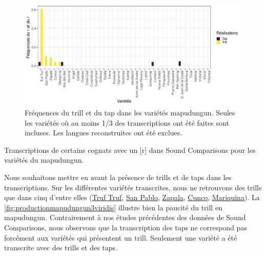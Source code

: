 \begin{figure}
	\centering
	\includegraphics[width=1\linewidth]{substance/images/freq_trill_mapudungun2}
	\caption[Fréquences du trill et du tap dans les variétés mapudungun]{Fréquences du trill et du tap dans les variétés mapudungun. Seules les variétés où au moins 1/3 des transcriptions ont été faites sont incluses. Les langues reconstruites ont été exclues.}
	\label{fig:freqtrillmapudungun}
\end{figure}


\begin{table}
	\centering
	\caption[Transcriptions de certains cognats avec un \textrm{[r]} dans Sound Comparisons pour les variétés du mapudungun]{Transcriptions de certains cognats avec un [r] dans Sound Comparisons pour les variétés du mapudungun.}
	\label{tab:productiontrill_mapudungun}
\end{table}

Nous souhaitons mettre en avant la présence de trills et de taps dans les transcriptions. Sur les différentes variétés transcrites, nous ne retrouvons des trills que dans cinq d'entre elles (\href{https://soundcomparisons.com/#/en/Mapudungun/language/Mpg_Chl_Rgn9_TrufTruf_Danquilco}{Truf Truf}, \href{https://soundcomparisons.com/#/en/Mapudungun/language/Mpg_Chl_Rgn10_SanPablo_Quilacahuin}{San Pablo}, \href{https://soundcomparisons.com/#/en/Mapudungun/language/Mpg_Arg_Nqn_Zapala_RamonCastro}{Zapala}, \href{https://soundcomparisons.com/#/en/Mapudungun/language/Mpg_Chl_Rgn9_Cunco_Huerere}{Cunco}, \href{https://soundcomparisons.com/#/en/Mapudungun/language/Mpg_Chl_Rgn14_SanJoseMariquina_Maiquillahue}{Mariquina}).
La \autoref{fig:productionmapudungun3viridis} illustre bien la paucité du trill en mapudungun. Contrairement à nos études précédentes des données de Sound Comparisons, nous observons que la transcription des taps
ne correspond pas forcément aux variétés qui présentent un trill. Seulement une variété a été transcrite avec des trills et des taps.\\

